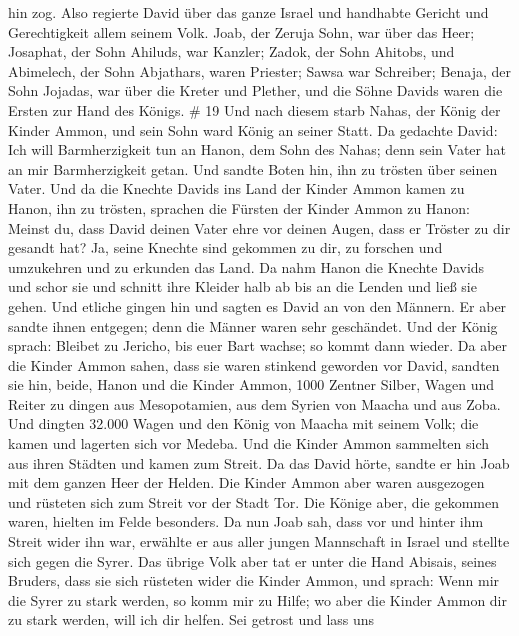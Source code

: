 hin zog.  Also regierte David über das ganze Israel und
handhabte Gericht und Gerechtigkeit allem seinem Volk. 
Joab, der Zeruja Sohn, war über das Heer; Josaphat, der Sohn Ahiluds,
war Kanzler;  Zadok, der Sohn Ahitobs, und Abimelech, der
Sohn Abjathars, waren Priester; Sawsa war Schreiber; 
Benaja, der Sohn Jojadas, war über die Kreter und Plether, und die Söhne
Davids waren die Ersten zur Hand des Königs. \# 19  Und nach
diesem starb Nahas, der König der Kinder Ammon, und sein Sohn ward König
an seiner Statt.  Da gedachte David: Ich will Barmherzigkeit
tun an Hanon, dem Sohn des Nahas; denn sein Vater hat an mir
Barmherzigkeit getan. Und sandte Boten hin, ihn zu trösten über seinen
Vater. Und da die Knechte Davids ins Land der Kinder Ammon kamen zu
Hanon, ihn zu trösten,  sprachen die Fürsten der Kinder
Ammon zu Hanon: Meinst du, dass David deinen Vater ehre vor deinen
Augen, dass er Tröster zu dir gesandt hat? Ja, seine Knechte sind
gekommen zu dir, zu forschen und umzukehren und zu erkunden das Land.
 Da nahm Hanon die Knechte Davids und schor sie und schnitt
ihre Kleider halb ab bis an die Lenden und ließ sie gehen. 
Und etliche gingen hin und sagten es David an von den Männern. Er aber
sandte ihnen entgegen; denn die Männer waren sehr geschändet. Und der
König sprach: Bleibet zu Jericho, bis euer Bart wachse; so kommt dann
wieder.  Da aber die Kinder Ammon sahen, dass sie waren
stinkend geworden vor David, sandten sie hin, beide, Hanon und die
Kinder Ammon, 1000 Zentner Silber, Wagen und Reiter zu dingen aus
Mesopotamien, aus dem Syrien von Maacha und aus Zoba.  Und
dingten 32.000 Wagen und den König von Maacha mit seinem Volk; die kamen
und lagerten sich vor Medeba. Und die Kinder Ammon sammelten sich aus
ihren Städten und kamen zum Streit.  Da das David hörte,
sandte er hin Joab mit dem ganzen Heer der Helden.  Die
Kinder Ammon aber waren ausgezogen und rüsteten sich zum Streit vor der
Stadt Tor. Die Könige aber, die gekommen waren, hielten im Felde
besonders.  Da nun Joab sah, dass vor und hinter ihm Streit
wider ihn war, erwählte er aus aller jungen Mannschaft in Israel und
stellte sich gegen die Syrer.  Das übrige Volk aber tat er
unter die Hand Abisais, seines Bruders, dass sie sich rüsteten wider die
Kinder Ammon,  und sprach: Wenn mir die Syrer zu stark
werden, so komm mir zu Hilfe; wo aber die Kinder Ammon dir zu stark
werden, will ich dir helfen.  Sei getrost und lass uns
